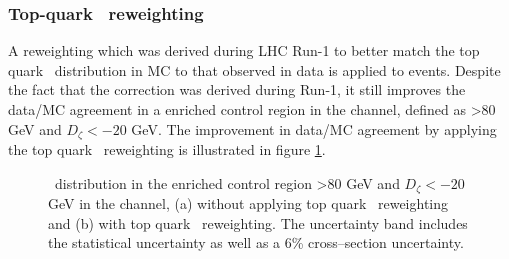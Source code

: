 \subsubsection*{Top-quark \pT~reweighting}
A reweighting which was derived during \ac{LHC} Run-1
to better match the top quark \pT~distribution in \ac{MC}
to that observed in data is applied to \ttbar events. Despite
the fact that the correction was derived during Run-1, it still
improves the data/\ac{MC} agreement in a \ttbar enriched
control region in the \emu channel, defined as 
\MET>80 GeV and $D_{\zeta}<-20$ GeV. The improvement in data/\ac{MC} agreement
by applying the top quark \pT~reweighting is illustrated in figure \ref{fig:mssm_corrs_toppt}.
\begin{figure}[h!]
\begin{center}
\end{center}
\caption[\mTtot~distribution in the \ttbar
enriched control region, with and without applying top quark \pT~reweighting.]{\mTtot~distribution in the \ttbar enriched control region \MET>80 GeV and $D_{\zeta}<-20$ GeV in the \emu channel,
(a) without applying top quark \pT~reweighting and (b) with top quark \pT~reweighting.
The uncertainty band includes the statistical uncertainty as well as a 6\% \ttbar cross--section uncertainty.}
\label{fig:mssm_corrs_toppt}
\end{figure}

